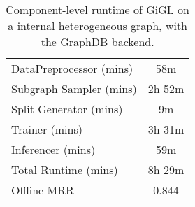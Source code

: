 \begin{table}[htp]
\centering
\caption{Component-level runtime of GiGL on a internal heterogeneous graph, with the GraphDB backend.}
\label{tab:scale-het}
\vspace{-0.1in}
\begin{tabular}{l|c} 
\toprule
DataPreprocessor (mins) & 58m \\
Subgraph Sampler (mins) & 2h 52m \\
Split Generator (mins) & 9m \\
Trainer (mins) & 3h 31m \\
Inferencer (mins) & 59m \\
Total Runtime (mins) & 8h 29m\\
Offline MRR & 0.844 \\
\bottomrule
\end{tabular}
\vspace{-0.1in}
\end{table}
